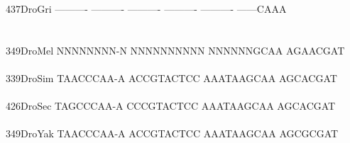 \documentclass[11pt,twoside,reqno,a4paper]{article}
\begin{document}
{437\hspace*{1\charwidth}DroGri	----------	----------	----------	----------	----------	------CAAA	\\
\hspace*{4\charwidth}\hspace*{7\charwidth}\hspace*{1\charwidth}\hspace*{1\charwidth}\hspace*{1\charwidth}\hspace*{1\charwidth}\hspace*{1\charwidth}\hspace*{1\charwidth}\\
\\
349\hspace*{1\charwidth}DroMel	NNNNNNNN-N	NNNNNNNNNN	NNNNNNGCAA	AGAACGAT\\
\hspace*{4\charwidth}\hspace*{7\charwidth}\hspace*{1\charwidth}\hspace*{1\charwidth}\hspace*{1\charwidth}\\
339\hspace*{1\charwidth}DroSim	TAACCCAA-A	ACCGTACTCC	AAATAAGCAA	AGCACGAT\\
\hspace*{4\charwidth}\hspace*{7\charwidth}\hspace*{1\charwidth}\hspace*{1\charwidth}\hspace*{1\charwidth}\\
426\hspace*{1\charwidth}DroSec	TAGCCCAA-A	CCCGTACTCC	AAATAAGCAA	AGCACGAT\\
\hspace*{4\charwidth}\hspace*{7\charwidth}\hspace*{1\charwidth}\hspace*{1\charwidth}\hspace*{1\charwidth}\\
349\hspace*{1\charwidth}DroYak	TAACCCAA-A	ACCGTACTCC	AAATAAGCAA	AGCGCGAT\\
\hspace*{4\charwidth}\hspace*{7\charwidth}\hspace*{1\charwidth}\hspace*{1\charwidth}\hspace*{1\charwidth}\\
}
\end{document}
